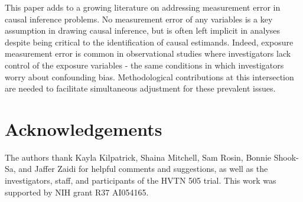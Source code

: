 \documentclass[useAMS,usenatbib,referee]{biom}
\begin{document}
This paper adds to a growing literature on addressing measurement error in causal inference problems. No measurement error of any variables is a key assumption in drawing causal inference, but is often left implicit in analyses despite being critical to the identification of causal estimands. Indeed, exposure measurement error is common in observational studies where investigators lack control of the exposure variables - the same conditions in which investigators worry about confounding bias. Methodological contributions at this intersection are needed to facilitate simultaneous adjustment for these prevalent issues.





\backmatter


\section*{Acknowledgements}

The authors thank Kayla Kilpatrick, Shaina Mitchell, Sam Rosin, Bonnie Shook-Sa, and Jaffer Zaidi for helpful comments and suggestions, as well as the investigators, staff, and participants of the HVTN 505 trial. This work was supported by NIH grant R37 AI054165. \vspace*{-8pt}


\end{document}
